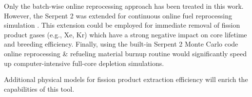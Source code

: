Only the batch-wise online reprocessing approach has been treated in this 
work. However, the Serpent 2 was extended for continuous online fuel 
reprocessing simulation \cite{aufiero_extended_2013}. This extension could be 
employed for immediate removal of fission product gases (e.g., Xe, Kr) which 
have a strong negative impact on core lifetime and breeding efficiency. 
Finally, using the built-in Serpent 2 Monte Carlo code online reprocessing \& 
refueling material burnup routine would significantly speed up 
computer-intensive full-core depletion simulations.


Additional physical models for fission product extraction efficiency will 
enrich the capabilities of this tool.



